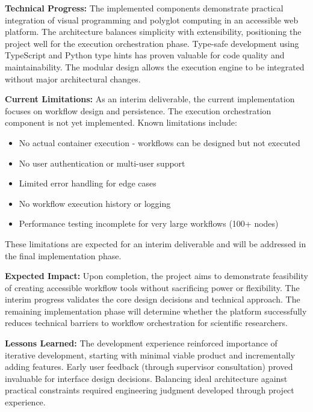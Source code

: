 \documentclass[12pt]{article}
\begin{document}
\hspace{\parindent}\textbf{Technical Progress:} The implemented components demonstrate practical integration of visual programming and polyglot computing in an accessible web platform. The architecture balances simplicity with extensibility, positioning the project well for the execution orchestration phase. Type-safe development using TypeScript and Python type hints has proven valuable for code quality and maintainability. The modular design allows the execution engine to be integrated without major architectural changes.

\hspace{\parindent}\textbf{Current Limitations:} As an interim deliverable, the current implementation focuses on workflow design and persistence. The execution orchestration component is not yet implemented. Known limitations include:

\begin{itemize}
    \item No actual container execution - workflows can be designed but not executed
    \item No user authentication or multi-user support
    \item Limited error handling for edge cases
    \item No workflow execution history or logging
    \item Performance testing incomplete for very large workflows (100+ nodes)
\end{itemize}

\hspace{\parindent}These limitations are expected for an interim deliverable and will be addressed in the final implementation phase.

\hspace{\parindent}\textbf{Expected Impact:} Upon completion, the project aims to demonstrate feasibility of creating accessible workflow tools without sacrificing power or flexibility. The interim progress validates the core design decisions and technical approach. The remaining implementation phase will determine whether the platform successfully reduces technical barriers to workflow orchestration for scientific researchers.

\hspace{\parindent}\textbf{Lessons Learned:} The development experience reinforced importance of iterative development, starting with minimal viable product and incrementally adding features. Early user feedback (through supervisor consultation) proved invaluable for interface design decisions. Balancing ideal architecture against practical constraints required engineering judgment developed through project experience.
\end{document}
